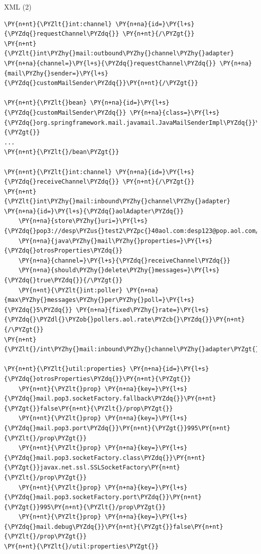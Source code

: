 \documentclass{beamer}
\begin{document}
\begin{frame}[fragile]{XML (2)}
\begin{Verbatim}[fontsize=\tiny,commandchars=\\\{\}]
\PY{n+nt}{\PYZlt{}int:channel} \PY{n+na}{id=}\PY{l+s}{\PYZdq{}requestChannel\PYZdq{}} \PY{n+nt}{/\PYZgt{}}
\PY{n+nt}{\PYZlt{}int\PYZhy{}mail:outbound\PYZhy{}channel\PYZhy{}adapter} \PY{n+na}{channel=}\PY{l+s}{\PYZdq{}requestChannel\PYZdq{}} \PY{n+na}{mail\PYZhy{}sender=}\PY{l+s}{\PYZdq{}customMailSender\PYZdq{}}\PY{n+nt}{/\PYZgt{}}

\PY{n+nt}{\PYZlt{}bean} \PY{n+na}{id=}\PY{l+s}{\PYZdq{}customMailSender\PYZdq{}} \PY{n+na}{class=}\PY{l+s}{\PYZdq{}org.springframework.mail.javamail.JavaMailSenderImpl\PYZdq{}}\PY{n+nt}{\PYZgt{}}
...
\PY{n+nt}{\PYZlt{}/bean\PYZgt{}}

\PY{n+nt}{\PYZlt{}int:channel} \PY{n+na}{id=}\PY{l+s}{\PYZdq{}receiveChannel\PYZdq{}} \PY{n+nt}{/\PYZgt{}}
\PY{n+nt}{\PYZlt{}int\PYZhy{}mail:inbound\PYZhy{}channel\PYZhy{}adapter} \PY{n+na}{id=}\PY{l+s}{\PYZdq{}aolAdapter\PYZdq{}}
    \PY{n+na}{store\PYZhy{}uri=}\PY{l+s}{\PYZdq{}pop3://desp\PYZus{}test2\PYZpc{}40aol.com:desp123@pop.aol.com/INBOX\PYZdq{}}
    \PY{n+na}{java\PYZhy{}mail\PYZhy{}properties=}\PY{l+s}{\PYZdq{}otrosProperties\PYZdq{}}
    \PY{n+na}{channel=}\PY{l+s}{\PYZdq{}receiveChannel\PYZdq{}}
    \PY{n+na}{should\PYZhy{}delete\PYZhy{}messages=}\PY{l+s}{\PYZdq{}true\PYZdq{}}{/\PYZgt{}}
    \PY{n+nt}{\PYZlt{}int:poller} \PY{n+na}{max\PYZhy{}messages\PYZhy{}per\PYZhy{}poll=}\PY{l+s}{\PYZdq{}5\PYZdq{}} \PY{n+na}{fixed\PYZhy{}rate=}\PY{l+s}{\PYZdq{}\PYZdl{}\PYZob{}pollers.aol.rate\PYZcb{}\PYZdq{}}\PY{n+nt}{/\PYZgt{}} 
\PY{n+nt}{\PYZlt{}/int\PYZhy{}mail:inbound\PYZhy{}channel\PYZhy{}adapter\PYZgt{}}

\PY{n+nt}{\PYZlt{}util:properties} \PY{n+na}{id=}\PY{l+s}{\PYZdq{}otrosProperties\PYZdq{}}\PY{n+nt}{\PYZgt{}}
    \PY{n+nt}{\PYZlt{}prop} \PY{n+na}{key=}\PY{l+s}{\PYZdq{}mail.pop3.socketFactory.fallback\PYZdq{}}\PY{n+nt}{\PYZgt{}}false\PY{n+nt}{\PYZlt{}/prop\PYZgt{}}
    \PY{n+nt}{\PYZlt{}prop} \PY{n+na}{key=}\PY{l+s}{\PYZdq{}mail.pop3.port\PYZdq{}}\PY{n+nt}{\PYZgt{}}995\PY{n+nt}{\PYZlt{}/prop\PYZgt{}}
    \PY{n+nt}{\PYZlt{}prop} \PY{n+na}{key=}\PY{l+s}{\PYZdq{}mail.pop3.socketFactory.class\PYZdq{}}\PY{n+nt}{\PYZgt{}}javax.net.ssl.SSLSocketFactory\PY{n+nt}{\PYZlt{}/prop\PYZgt{}}
    \PY{n+nt}{\PYZlt{}prop} \PY{n+na}{key=}\PY{l+s}{\PYZdq{}mail.pop3.socketFactory.port\PYZdq{}}\PY{n+nt}{\PYZgt{}}995\PY{n+nt}{\PYZlt{}/prop\PYZgt{}}
    \PY{n+nt}{\PYZlt{}prop} \PY{n+na}{key=}\PY{l+s}{\PYZdq{}mail.debug\PYZdq{}}\PY{n+nt}{\PYZgt{}}false\PY{n+nt}{\PYZlt{}/prop\PYZgt{}}
\PY{n+nt}{\PYZlt{}/util:properties\PYZgt{}}
\end{Verbatim}
\end{frame}
\end{document}
